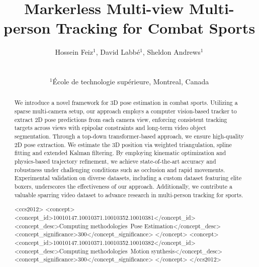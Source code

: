 \documentclass{egpubl}
\title{Markerless Multi-view Multi-person Tracking for Combat Sports}
\author[Hossein, Labbé, and Andrews]
{\parbox{\textwidth}{\centering 
        Hossein Feiz$^1$, David Labbé$^1$, Sheldon Andrews$^1$
        }
        \\
{\parbox{\textwidth}{\centering 
        $^1$École de technologie supérieure, Montreal, Canada
       }
}
}
\begin{document}

\maketitle

\begin{abstract}
   We introduce a novel framework for 3D pose estimation in combat sports. Utilizing a sparse multi-camera setup, our approach employs a computer vision-based tracker to extract 2D pose predictions from each camera view, enforcing consistent tracking targets across views with epipolar constraints and long-term video object segmentation. Through a top-down transformer-based approach, we ensure high-quality 2D pose extraction. We estimate the 3D position via weighted triangulation, spline fitting and extended Kalman filtering. By employing kinematic optimization and physics-based trajectory refinement, we achieve state-of-the-art accuracy and robustness under challenging conditions such as occlusion and rapid movements. Experimental validation on diverse datasets, including a custom dataset featuring elite boxers, underscores the effectiveness of our approach. Additionally, we contribute a valuable sparring video dataset to advance research in multi-person tracking for sports.

\begin{CCSXML}
<ccs2012>
<concept>
<concept_id>10010147.10010371.10010352.10010381</concept_id>
<concept_desc>Computing methodologies~Pose Estimation</concept_desc>
<concept_significance>300</concept_significance>
</concept>
<concept>
<concept_id>10010147.10010371.10010352.10010382</concept_id>
<concept_desc>Computing methodologies~Motion synthesis</concept_desc>
<concept_significance>300</concept_significance>
</concept>
</ccs2012>
\end{CCSXML}



\printccsdesc   
\end{abstract}  
\end{document}
